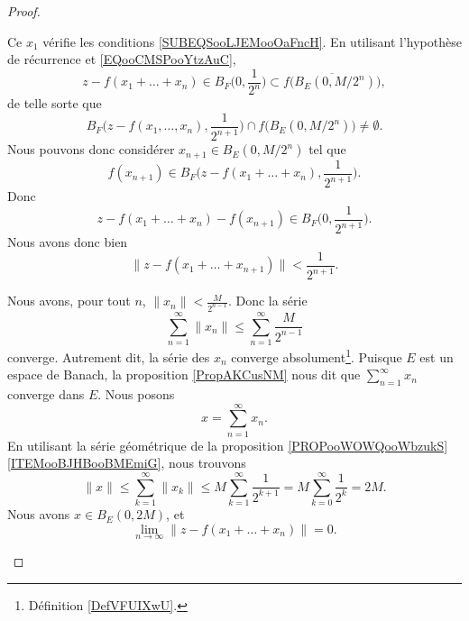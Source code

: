 \begin{proof}
\begin{subproof}
\begin{subproof}
			Ce \( x_1\) vérifie les conditions \eqref{SUBEQSooLJEMooOaFncH}.
			\spitem[La récurrence]
			En utilisant l'hypothèse de récurrence et \eqref{EQooCMSPooYtzAuC},
			\begin{equation}
				z-f(x_1+\ldots +x_n)\in B_F\big( 0,\frac{1}{ 2^n } \big)\subset\overline{ f\big( B_E(0,M/2^n) \big) },
			\end{equation}
			de telle sorte que
			\begin{equation}
				B_F\big( z-f(x_1,\ldots, x_n),\frac{1}{ 2^{n+1} } \big)\cap f\big( B_E(0,M/2^n) \big)\neq \emptyset.
			\end{equation}
			Nous pouvons donc considérer \( x_{n+1}\in B_E(0,M/2^n)\) tel que
			\begin{equation}
				f(x_{n+1})\in B_F\big( z-f(x_1+\ldots +x_n),\frac{1}{ 2^{n+1} } \big).
			\end{equation}
			Donc
			\begin{equation}
				z-f(x_1+\ldots +x_n)-f(x_{n+1})\in B_F\big( 0,\frac{1}{ 2^{n+1} } \big).
			\end{equation}
			Nous avons donc bien
			\begin{equation}
				\| z-f(x_1+\ldots +x_{n+1}) \|<\frac{1}{ 2^{n+1} }.
			\end{equation}
		\end{subproof}
		\spitem[Convergence]
		Nous avons, pour tout \( n\), \( \| x_n \|<\frac{ M }{ 2^{n-1} }\). Donc la série
		\begin{equation}
			\sum_{n=1}^{\infty}\| x_n \|\leq \sum_{n=1}^{\infty}\frac{ M }{ 2^{n-1} }
		\end{equation}
		converge. Autrement dit, la série des \( x_n\) converge absolument\footnote{Définition \ref{DefVFUIXwU}.}. Puisque \( E\) est un espace de Banach, la proposition \ref{PropAKCusNM} nous dit que \( \sum_{n=1}^{\infty}x_n\) converge dans \( E\). Nous posons
		\begin{equation}
			x=\sum_{n=1}^{\infty}x_n.
		\end{equation}
		En utilisant la série géométrique de la proposition \ref{PROPooWOWQooWbzukS}\ref{ITEMooBJHBooBMEmiG}, nous trouvons
		\begin{equation}
			\| x \|\leq \sum_{k=1}^{\infty}\| x_k \|\leq M\sum_{k=1}^{\infty}\frac{1}{ 2^{k+1} }=M\sum_{k=0}^{\infty}\frac{1}{ 2^k }=2M.
		\end{equation}
		Nous avons \( x\in B_E(0,2M)\), et
		\begin{equation}
			\lim_{n\to \infty} \| z-f(x_1+\ldots +x_n) \|=0.
		\end{equation}

\end{subproof}
\end{proof}
